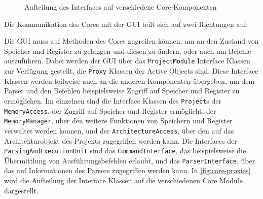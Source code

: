 \begin{figure}
\begin{center}

    \end{center}
    \caption{Aufteilung des Interfaces auf verschiedene Core-Komponenten}
    \label{fig:core-proxies}
\end{figure}

Die Kommunikation des Cores mit der GUI teilt sich auf zwei Richtungen auf:

Die GUI muss auf Methoden des Cores zugreifen können, um an den Zustand von
Speicher und Register zu gelangen und diesen zu ändern, oder auch um Befehle
auszuführen. Dabei werden der GUI über das \texttt{ProjectModule} Interface
Klassen zur Verfügung gestellt, die \texttt{Proxy} Klassen der Active Objects
sind. Diese Interface Klassen werden teilweise auch an die anderen Komponenten
übergeben, um dem Parser und den Befehlen beispielsweise Zugriff auf Speicher
und Register zu ermöglichen. Im einzelnen sind die Interface Klassen des
\texttt{Project}s der \texttt{MemoryAccess}, der Zugriff auf Speicher und
Register ermöglicht, der \texttt{MemoryManager}, über den weitere Funktionen von
Speichern und Register verwaltet werden können, und der
\texttt{ArchitectureAccess}, über den auf das Architekturobjekt des Projekts
zugegriffen werden kann. Die Interfaces der \texttt{ParsingAndExecutionUnit}
sind das \texttt{CommandInterface}, das beispielsweise die Übermittlung von
Ausführungsbefehlen erlaubt, und das \texttt{ParserInterface}, über das auf
Informationen des Parsers zugegriffen werden kann. In \autoref{fig:core-proxies}
wird die Aufteilung der Interface Klassen auf die verschiedenen Core Module
dargestellt.

